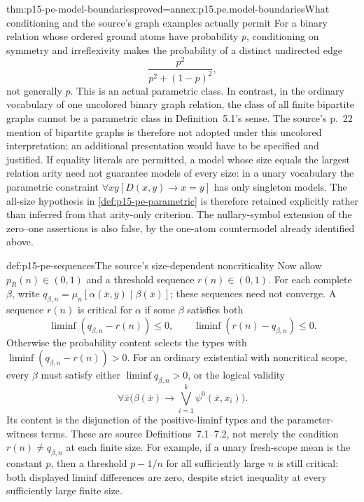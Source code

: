 \begin{hbtheorem}{thm:p15-pe-model-boundaries}{proved=annex:p15.pe.model-boundaries}{What conditioning and the source's graph examples actually permit}
For a binary relation whose ordered ground atoms have probability \(p\),
conditioning on symmetry and irreflexivity makes the probability of a
distinct undirected edge
\[
             \frac{p^2}{p^2+(1-p)^2},
\]
not generally \(p\). This is an actual parametric class.
In contrast, in the ordinary vocabulary of one uncolored binary graph
relation, the class of all finite bipartite graphs cannot be a parametric
class in Definition~5.1's sense. The source's p.~22 mention of bipartite
graphs is therefore not adopted under this uncolored interpretation;
an additional presentation would have to be specified and justified.
If equality literals are permitted, a model whose size equals the
largest relation arity need not guarantee models of every size:
in a unary vocabulary the parametric constraint
\(\forall x y[D(x,y)\to x=y]\) has only singleton models.
The all-size hypothesis in \cref{def:p15-pe-parametric} is therefore
retained explicitly rather than inferred from that arity-only criterion.
The nullary-symbol extension of the zero--one assertions is also false,
by the one-atom countermodel already identified above.
\end{hbtheorem}

\begin{hbdefinition}{def:p15-pe-sequences}{The source's size-dependent noncriticality}
Now allow \(p_R(n)\in(0,1)\) and a threshold sequence \(r(n)\in(0,1)\).
For each complete \(\beta\), write
\(q_{\beta,n}=\mu_n[\alpha(\bar x,\bar y)\mid\beta(\bar x)]\);
these sequences need not converge. A sequence \(r(n)\) is critical for
\(\alpha\) if some \(\beta\) satisfies both
\[
 \liminf(q_{\beta,n}-r(n))\le0,\qquad
 \liminf(r(n)-q_{\beta,n})\le0.
\]
Otherwise the probability content selects the types with
\(\liminf(q_{\beta,n}-r(n))>0\).
For an ordinary existential with noncritical scope, every \(\beta\)
must satisfy either \(\liminf q_{\beta,n}>0\), or the logical validity
\[
 \forall\bar x\bigl(\beta(\bar x)\to
                       \bigvee_{i=1}^{k}\psi^0(\bar x,x_i)\bigr).
\]
Its content is the disjunction of the positive-liminf types and the
parameter-witness terms. These are source Definitions~7.1--7.2,
not merely the condition \(r(n)\ne q_{\beta,n}\) at each finite size.
For example, if a unary fresh-scope mean is the constant \(p\), then
a threshold \(p-1/n\) for all sufficiently large \(n\) is still critical:
both displayed liminf differences are zero, despite strict inequality
at every sufficiently large finite size.
\end{hbdefinition}


